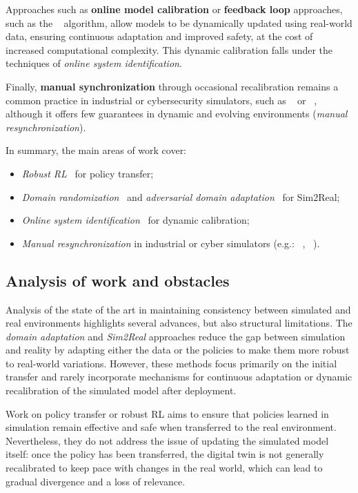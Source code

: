 Approaches such as \textbf{online model calibration} or \textbf{feedback loop} approaches, such as the ~\cite{deisenroth2011pilco} algorithm, allow models to be dynamically updated using real-world data, ensuring continuous adaptation and improved safety, at the cost of increased computational complexity. This dynamic calibration falls under the techniques of \textit{online system identification}.

Finally, \textbf{manual synchronization} through occasional recalibration remains a common practice in industrial or cybersecurity simulators, such as ~\cite{Standen2021} or \phantom{XXXX} ~\cite{cyberbattlesim}, although it offers few guarantees in dynamic and evolving environments (\textit{manual resynchronization}).

\medskip

In summary, the main areas of work cover:
\begin{itemize}
  \item \textit{Robust RL}~\cite {pinto2017robust} for policy transfer;
  \item \textit{Domain randomization}~\cite{tobin2017domain} and \textit{adversarial domain adaptation}~\cite{ganin2016domain} for Sim2Real;
  \item \textit{Online system identification}~\cite{deisenroth2011pilco} for dynamic calibration;
  \item \textit{Manual resynchronization} in industrial or cyber simulators (e.g.: ~\cite{Standen2021}, ~\cite{cyberbattlesim}).
\end{itemize}


\subsection*{Analysis of work and obstacles}

Analysis of the state of the art in maintaining consistency between simulated and real environments highlights several advances, but also structural limitations. The \textit{domain adaptation} and \textit{Sim2Real} approaches reduce the gap between simulation and reality by adapting either the data or the policies to make them more robust to real-world variations. However, these methods focus primarily on the initial transfer and rarely incorporate mechanisms for continuous adaptation or dynamic recalibration of the simulated model after deployment.

Work on policy transfer or robust RL aims to ensure that policies learned in simulation remain effective and safe when transferred to the real environment. Nevertheless, they do not address the issue of updating the simulated model itself: once the policy has been transferred, the digital twin is not generally recalibrated to keep pace with changes in the real world, which can lead to gradual divergence and a loss of relevance.

